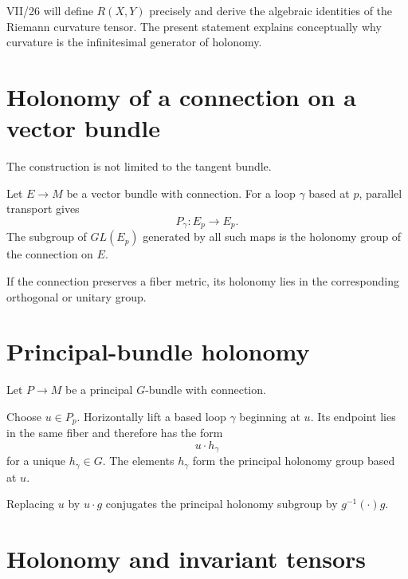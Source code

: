 \begin{remark}
VII/26 will define \(R(X,Y)\) precisely and derive the algebraic identities of the
Riemann curvature tensor.  The present statement explains conceptually why
curvature is the infinitesimal generator of holonomy.
\end{remark}

\section{Holonomy of a connection on a vector bundle}

The construction is not limited to the tangent bundle.

\begin{definition}\label{def:vii25-bundle-holonomy}
Let \(E\to M\) be a vector bundle with connection.  For a loop \(\gamma\) based at
\(p\), parallel transport gives
\[
P_\gamma:E_p\to E_p.
\]
The subgroup of \(GL(E_p)\) generated by all such maps is the holonomy group of the
connection on \(E\).
\end{definition}

If the connection preserves a fiber metric, its holonomy lies in the corresponding
orthogonal or unitary group.

\section{Principal-bundle holonomy}

Let \(P\to M\) be a principal \(G\)-bundle with connection.

\begin{definition}\label{def:vii25-principal}
Choose \(u\in P_p\).  Horizontally lift a based loop \(\gamma\) beginning at \(u\).
Its endpoint lies in the same fiber and therefore has the form
\[
u\cdot h_\gamma
\]
for a unique \(h_\gamma\in G\).  The elements \(h_\gamma\) form the principal
holonomy group based at \(u\).
\end{definition}

\begin{proposition}\label{prop:vii25-fiber-conjugacy}
Replacing \(u\) by \(u\cdot g\) conjugates the principal holonomy subgroup by
\(g^{-1}(\cdot)g\).
\end{proposition}

\section{Holonomy and invariant tensors}

